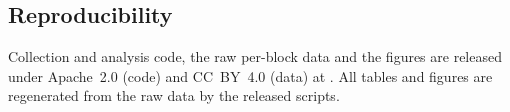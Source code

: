 \subsection{Reproducibility}
\label{sec:meth-reproducibility}

Collection and analysis code, the raw per-block data and the figures are released under Apache~2.0 (code) and CC~BY~4.0 (data) at \repolink. All tables and figures are regenerated from the raw data by the released scripts.
